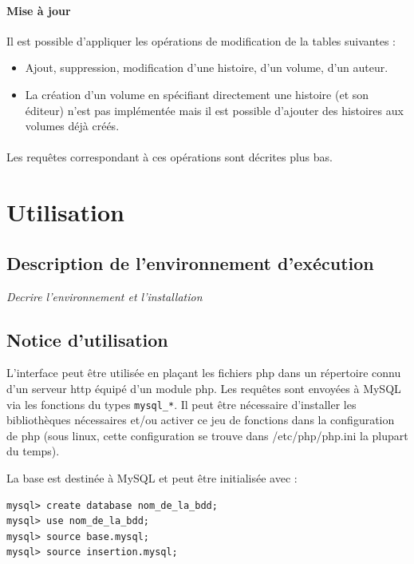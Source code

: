 \documentclass[12pt]{article}
\begin{document}
\paragraph{Mise à jour}
Il est possible d'appliquer les opérations de modification de la tables
suivantes :
\begin{itemize}
	\item Ajout, suppression, modification d’une histoire, d’un volume, d’un auteur.
	\item La création d'un volume en spécifiant directement une histoire (et
		son éditeur) n'est pas implémentée mais il est possible d'ajouter des
		histoires aux volumes déjà créés.
\end{itemize}

\paragraph{}
Les requêtes correspondant à ces opérations sont décrites plus bas.


\section{Utilisation}

\subsection{Description de l'environnement d'exécution}

\emph{Decrire l'environnement et l'installation}

\subsection{Notice d'utilisation}

L'interface peut être utilisée en plaçant les fichiers php dans un répertoire
connu d'un serveur http équipé d'un module php. Les requêtes sont envoyées à
MySQL via les fonctions du types \verb!mysql_*!. Il peut être nécessaire
d'installer les bibliothèques nécessaires et/ou activer ce jeu de fonctions
dans la configuration de php (sous linux, cette configuration se trouve dans
/etc/php/php.ini la plupart du temps).

La base est destinée à MySQL et peut être initialisée avec :
\begin{verbatim}
mysql> create database nom_de_la_bdd;
mysql> use nom_de_la_bdd;
mysql> source base.mysql;
mysql> source insertion.mysql;
\end{verbatim}
\end{document}
